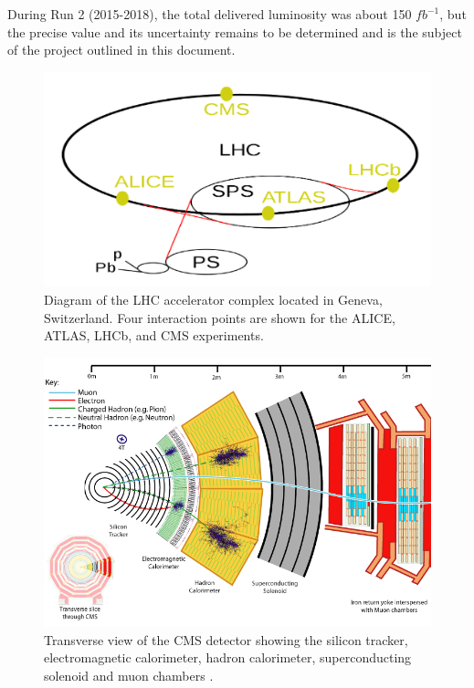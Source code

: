 \documentclass[final,3p]{CSP}
\begin{document}
During Run 2 (2015-2018), the total delivered luminosity was about 150 $fb^{-1}$, but the precise value and its uncertainty remains to be determined and is the subject of the project outlined in this document.








\begin{figure}[H]
  \centering
  \includegraphics[width=0.7\columnwidth]{./LHCcomplex.png}
  \caption{Diagram of the LHC accelerator complex located in Geneva, Switzerland. Four interaction points are shown for the ALICE, ATLAS, LHCb, and CMS experiments.}
  \label{figure5}
\end{figure}

\begin{figure}[H]
  \centering
  \includegraphics[width=0.7\columnwidth]{./cms12.png}
  \caption{Transverse view of the CMS detector showing the silicon tracker, electromagnetic calorimeter, hadron calorimeter, superconducting solenoid and muon chambers \cite{Chatrchyan:2008aa}.}
  \label{figure5}
\end{figure}
\end{document}

